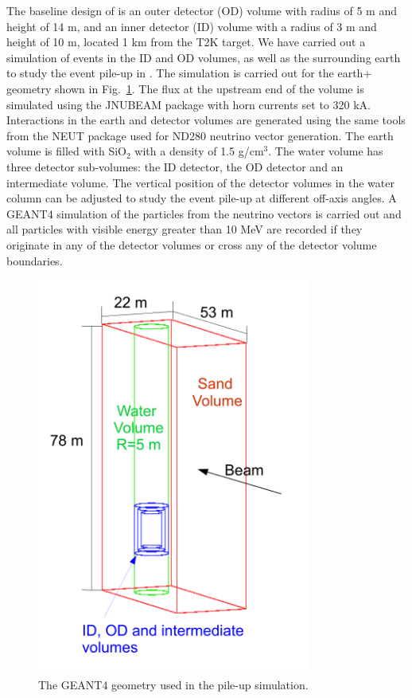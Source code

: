 The baseline design of \nuprismlite is an outer detector (OD) volume with radius of 5 m and 
height of 14 m, and an inner detector (ID) volume with a radius of 3 m and height of 10 m, located
1 km from the T2K target.  We have carried out a simulation of events in the 
\nuprismlite ID and OD volumes, as well as the surrounding earth to study the event pile-up
in \nuprismlite.  The simulation is carried out for the earth+\nuprismlite 
geometry shown in Fig.~\ref{fig:sand_geom}.  The flux at the upstream end of the volume is simulated
using the JNUBEAM package with horn currents set to 320 kA.  Interactions in the earth and detector 
volumes are generated using the same tools from the NEUT package used for ND280 neutrino vector
generation.  The earth volume is filled with SiO$_{2}$ with a density of 1.5 g/cm$^{3}$.  The water volume
has three detector sub-volumes: the ID detector, the OD detector and an intermediate volume.
The vertical position of the detector volumes in the water column can be adjusted to study the
event pile-up at different off-axis angles.  A GEANT4 simulation of the particles from the neutrino
vectors is carried out and all particles with visible energy greater than 10 MeV are recorded if they 
originate in any of the detector volumes or cross any of the detector volume boundaries.

\begin {figure}[htbp]
  \begin{center}
    \includegraphics[width=9cm]{figures/nuprism_sand_geom.pdf}
    \caption{The GEANT4 geometry used in the pile-up simulation.}
    \label{fig:sand_geom}
  \end{center}
\end {figure}


